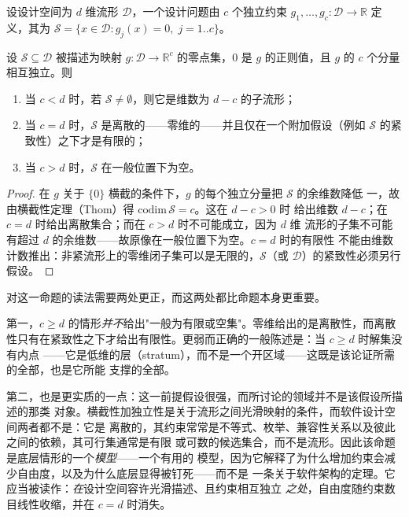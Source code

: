 \begin{definition}[约束系统与解集]\label{def:constraint}
设设计空间为 $d$ 维流形 $\mathcal{D}$，一个设计问题由 $c$ 个独立约束
$g_1, \dots, g_c : \mathcal{D} \to \mathbb{R}$ 定义，其为
$\mathcal{S} = \{x \in \mathcal{D} : g_j(x) = 0,\; j = 1..c\}$。
\end{definition}

\begin{proposition}\label{prop:overconstrain}
设 $\mathcal{S} \subseteq \mathcal{D}$ 被描述为映射 $g : \mathcal{D} \to
\mathbb{R}^{c}$ 的零点集，$0$ 是 $g$ 的正则值，且 $g$ 的 $c$ 个分量相互独立。则
\begin{enumerate}[label=(\alph*)]
\item 当 $c < d$ 时，若 $\mathcal{S} \ne \emptyset$，则它是维数为 $d - c$ 的子流形；
\item 当 $c = d$ 时，$\mathcal{S}$ 是离散的——零维的——并且仅在一个附加假设（例如
      $\mathcal{S}$ 的紧致性）之下才是有限的；
\item 当 $c > d$ 时，$\mathcal{S}$ 在一般位置下为空。
\end{enumerate}
\end{proposition}

\begin{proof}
在 $g$ 关于 $\{0\}$ 横截的条件下，$g$ 的每个独立分量把 $\mathcal{S}$ 的余维数降低
一，故由横截性定理（Thom）得 $\mathrm{codim}\,\mathcal{S} = c$。这在 $d - c > 0$ 时
给出维数 $d - c$；在 $c = d$ 时给出离散集合；而在 $c > d$ 时不可能成立，因为 $d$ 维
流形的子集不可能有超过 $d$ 的余维数——故原像在一般位置下为空。$c = d$ 时的有限性
不能由维数计数推出：非紧流形上的零维闭子集可以是无限的，$\mathcal{S}$（或
$\mathcal{D}$）的紧致性必须另行假设。
\end{proof}

对这一命题的读法需要两处更正，而这两处都比命题本身更重要。

第一，$c \ge d$ 的情形\emph{并不}给出"一般为有限或空集"。零维给出的是离散性，而离散
性只有在紧致性之下才给出有限性。更弱而正确的一般陈述是：当 $c \ge d$ 时解集没有内点
——它是低维的层（stratum），而不是一个开区域——这既是该论证所需的全部，也是它所能
支撑的全部。

第二，也是更实质的一点：这一前提假设很强，而所讨论的领域并不是该假设所描述的那类
对象。横截性加独立性是关于流形之间光滑映射的条件，而软件设计空间两者都不是：它是
离散的，其约束常常是不等式、枚举、兼容性关系以及彼此之间的依赖，其可行集通常是有限
或可数的候选集合，而不是流形。因此该命题是底层情形的一个\emph{模型}——一个有用的
模型，因为它解释了为什么增加约束会减少自由度，以及为什么底层显得被钉死——而不是
一条关于软件架构的定理。它应当被读作：\emph{在}设计空间容许光滑描述、且约束相互独立
\emph{之处}，自由度随约束数目线性收缩，并在 $c = d$ 时消失。


